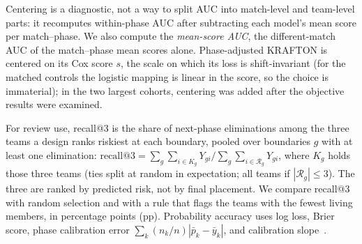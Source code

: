 \documentclass[sigconf,anonymous]{acmart}
\begin{document}
Centering is a diagnostic, not a way to split AUC into match-level and team-level parts: it recomputes within-phase AUC after subtracting each model's mean score per match--phase. We also compute the \emph{mean-score AUC}, the different-match AUC of the match--phase mean scores alone. Phase-adjusted KRAFTON is centered on its Cox score $s$, the scale on which its loss is shift-invariant (for the matched controls the logistic mapping is linear in the score, so the choice is immaterial); in the two largest cohorts, centering was added after the objective results were examined.

For review use, recall@3 is the share of next-phase eliminations among the three teams a design ranks riskiest at each boundary, pooled over boundaries $g$ with at least one elimination: $\mathrm{recall@3}=\sum_g\sum_{i\in K_g}Y_{gi}\big/\sum_g\sum_{i\in\mathcal{R}_g}Y_{gi}$, where $K_g$ holds those three teams (ties split at random in expectation; all teams if $|\mathcal{R}_g|\le3$). The three are ranked by predicted risk, not by final placement. We compare recall@3 with random selection and with a rule that flags the teams with the fewest living members, in percentage points (pp). Probability accuracy uses log loss, Brier score, phase calibration error $\sum_k(n_k/n)|\bar p_k-\bar y_k|$, and calibration slope~\cite{VanCalster16}.
\end{document}

